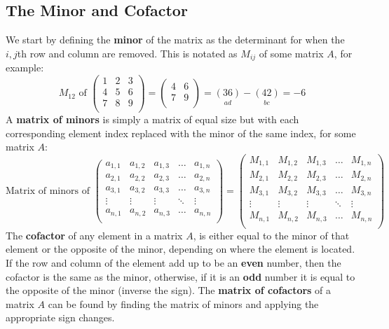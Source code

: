 \documentclass[a4paper]{article}
\begin{document}
  \subsection{The Minor and Cofactor}
  We start by defining the \textbf{minor} of the matrix as the determinant for when the $i,j$th row and column are removed. This is notated as $M_{ij}$ of some matrix $A$, for example:
  \[
    M_{12} \textrm{ of }
    \begin{pmatrix}
      1 & 2 & 3 \\ 
      4 & 5 & 6 \\ 
      7 & 8 & 9 \\ 
    \end{pmatrix}
    =
    \begin{pmatrix}
      4 & 6 \\ 
      7 & 9 \\ 
    \end{pmatrix}
    = \underset{ad}{(36)} - \underset{bc}{(42)} = -6
  \]
  A \textbf{matrix of minors} is simply a matrix of equal size but with each corresponding element index replaced with the minor of the same index, for some matrix $A$:
  \[
    \textrm{Matrix of minors of }
    \begin{pmatrix}
      a_{1,1} & a_{1,2} & a_{1,3}& \dots & a_{1,n} \\
      a_{2,1} & a_{2,2} & a_{2,3}&\dots & a_{2,n} \\
      a_{3,1} & a_{3,2} & a_{3,3}&\dots & a_{3,n} \\
      \vdots & \vdots & \vdots&\ddots & \vdots\\
      a_{n,1} & a_{n,2} & a_{n,3}&\dots & a_{n,n} \\
    \end{pmatrix}
    = 
    \begin{pmatrix}
      M_{1,1} & M_{1,2} & M_{1,3}&\dots & M_{1,n} \\
      M_{2,1} & M_{2,2} & M_{2,3}&\dots & M_{2,n} \\
      M_{3,1} & M_{3,2} & M_{3,3}&\dots & M_{3,n} \\
      \vdots & \vdots & \vdots&\ddots & \vdots\\
      M_{n,1} & M_{n,2} & M_{n,3}&\dots & M_{n,n} \\
    \end{pmatrix}
  \]
  The \textbf{cofactor} of any element in a matrix $A$, is either equal to the minor of that element or the opposite of the minor, depending on where the element is located. If the row and column of the element add up to be an \textbf{even} number, then the cofactor is the same as the minor, otherwise, if it is an \textbf{odd} number it is equal to the opposite of the minor (inverse the sign).
  The \textbf{matrix of cofactors} of a matrix $A$ can be found by finding the matrix of minors and applying the appropriate sign changes.
\end{document}

